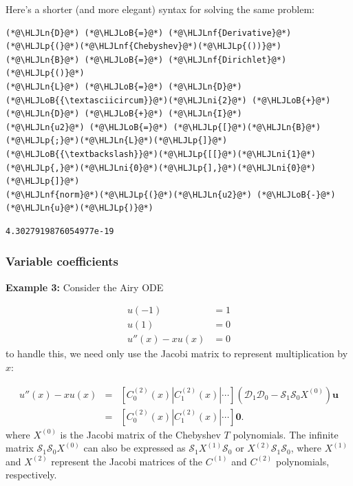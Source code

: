 \documentclass[12pt,a4paper]{article}
\newcommand{\HLJLn}[1]{#1}
\newcommand{\HLJLnf}[1]{\textcolor[RGB]{66,102,213}{#1}}
\newcommand{\HLJLni}[1]{\textcolor[RGB]{59,151,46}{#1}}
\newcommand{\HLJLoB}[1]{\textcolor[RGB]{102,102,102}{\textbf{#1}}}
\newcommand{\HLJLp}[1]{#1}
\begin{document}
Here's a shorter (and more elegant) syntax for solving the same problem:


\begin{lstlisting}
(*@\HLJLn{D}@*) (*@\HLJLoB{=}@*) (*@\HLJLnf{Derivative}@*)(*@\HLJLp{(}@*)(*@\HLJLnf{Chebyshev}@*)(*@\HLJLp{())}@*)
(*@\HLJLn{B}@*) (*@\HLJLoB{=}@*) (*@\HLJLnf{Dirichlet}@*)(*@\HLJLp{()}@*)
(*@\HLJLn{L}@*) (*@\HLJLoB{=}@*) (*@\HLJLn{D}@*)(*@\HLJLoB{{\textasciicircum}}@*)(*@\HLJLni{2}@*) (*@\HLJLoB{+}@*) (*@\HLJLn{D}@*) (*@\HLJLoB{+}@*) (*@\HLJLn{I}@*)
(*@\HLJLn{u2}@*) (*@\HLJLoB{=}@*) (*@\HLJLp{[}@*)(*@\HLJLn{B}@*)(*@\HLJLp{;}@*)(*@\HLJLn{L}@*)(*@\HLJLp{]}@*)(*@\HLJLoB{{\textbackslash}}@*)(*@\HLJLp{[[}@*)(*@\HLJLni{1}@*)(*@\HLJLp{,}@*)(*@\HLJLni{0}@*)(*@\HLJLp{],}@*)(*@\HLJLni{0}@*)(*@\HLJLp{]}@*)
(*@\HLJLnf{norm}@*)(*@\HLJLp{(}@*)(*@\HLJLn{u2}@*) (*@\HLJLoB{-}@*) (*@\HLJLn{u}@*)(*@\HLJLp{)}@*)
\end{lstlisting}

\begin{lstlisting}
4.3027919876054977e-19
\end{lstlisting}


\subsubsection{Variable coefficients}
\textbf{Example 3:} Consider the Airy ODE


\begin{align*}
u(-1) &= 1\\
u(1) &= 0\\
u''(x) - xu(x) &= 0
\end{align*}
to handle this, we need only use the Jacobi matrix to represent multiplication by $x$:


\begin{eqnarray*}
u''(x) - xu(x)  &=& \left[ C_0^{(2)}(x) | C_1^{(2)}(x) | \cdots \right]\left(\mathcal{D}_1\mathcal{D}_0  - \mathcal{S}_1\mathcal{S}_0X^{(0)}   \right) \mathbf{u} \\
 &=& \left[ C_0^{(2)}(x) | C_1^{(2)}(x) | \cdots \right]\mathbf{0}.
 \end{eqnarray*}
where $X^{(0)}$ is the Jacobi matrix of the Chebyshev $T$ polynomials. The infinite matrix $\mathcal{S}_1\mathcal{S}_0X^{(0)}$ can also be expressed as $\mathcal{S}_1X^{(1)}\mathcal{S}_0$ or $X^{(2)}\mathcal{S}_1\mathcal{S}_0$, where $X^{(1)}$ and $X^{(2)}$ represent the Jacobi matrices of the $C^{(1)}$ and $C^{(2)}$ polynomials, respectively. 
\end{document}
